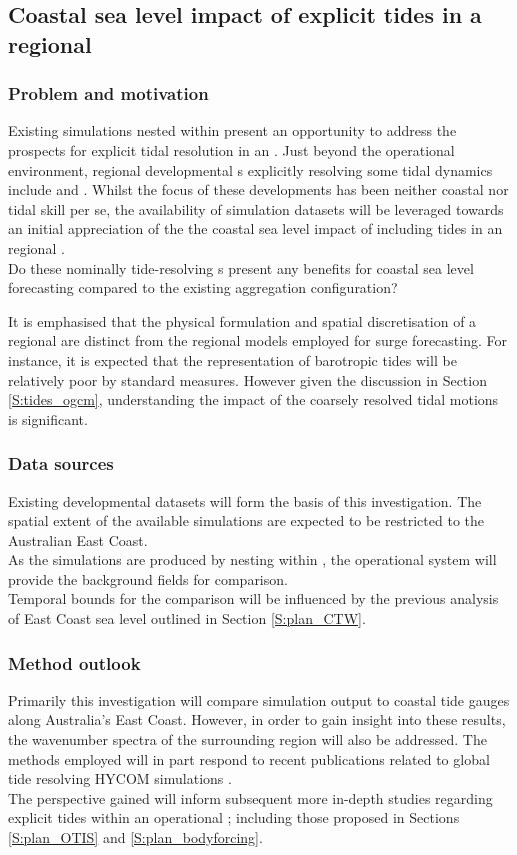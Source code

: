 \newpage
\subsection{Coastal sea level impact of explicit tides in a regional \OGCM{}}
\label{S:plan_OFAMR}
\subsubsection{Problem and motivation}
Existing simulations nested within \BL{} present an opportunity to address the prospects for explicit tidal resolution in an \OGCM{}.   Just beyond the \BOM{} operational environment, regional developmental \OGCM{}s explicitly resolving some tidal dynamics include \ER{} and \OFAMHR{}.   Whilst the focus of these developments has been neither coastal nor tidal skill per se, the availability of simulation datasets will be leveraged towards an initial appreciation of the the coastal sea level impact of including tides in an regional \OGCM{}.\\


\BoxBegin{}
Do these nominally tide-resolving \OGCM{}s present any benefits for coastal sea level forecasting compared to the existing aggregation configuration?
\BoxEnd{}

It is emphasised that the physical formulation and spatial discretisation of a regional \OGCM{} are distinct from the regional models employed for surge forecasting.   For instance, it is expected that the representation of barotropic tides will be relatively poor by standard measures. However given the discussion in Section \ref{S:tides_ogcm}, understanding the impact of the coarsely resolved tidal motions is significant.



\subsubsection{Data sources}
Existing developmental datasets will form the basis of this investigation. The spatial extent of the available simulations are expected to be restricted to the Australian East Coast.\\
As the simulations are produced by nesting within \BL{}, the operational system will provide the background fields for comparison.\\
Temporal bounds for the comparison will be influenced by the previous analysis of East Coast sea level outlined in Section \ref{S:plan_CTW}.


\subsubsection{Method outlook}
Primarily this investigation will compare simulation output to coastal tide gauges along Australia's East Coast.  However, in order to gain insight into these results, the wavenumber spectra of the surrounding region will also be addressed.   The methods employed will in part respond to recent publications related to global tide resolving HYCOM simulations \cite{Richman:2012bz}.\\



The perspective gained will inform subsequent more in-depth studies regarding explicit tides within an operational \OGCM{}; including those proposed in Sections \ref{S:plan_OTIS} and \ref{S:plan_bodyforcing}.




